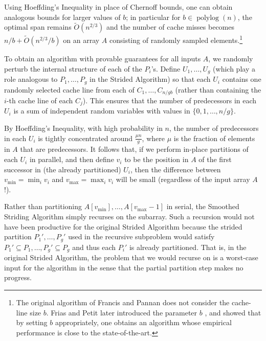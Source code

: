 \documentclass[sigconf, 10pt, nonacm]{acmart}
\renewcommand{\paragraph}[1]{\vspace{0.09in}\noindent{\bf \boldmath #1.}}
\theoremstyle{remark}
\theoremstyle{remark}
\begin{document}
Using Hoeffding's Inequality in place of Chernoff bounds, one can
obtain analogous bounds for larger values of $b$; in particular for $b
\in \operatorname{polylog}(n)$, the optimal span remains
$\tilde{O}(n^{2/3})$ and the number of cache misses becomes $n / b +
\tilde{O}(n^{2/3} / b)$ on an array $A$ consisting of randomly sampled
elements.\footnote{The original algorithm of Francis and Pannan
  \cite{FrancisPa92} does not consider the cache-line size $b$. Frias
  and Petit later introduced the parameter $b$ \cite{Frias08}, and
  showed that by setting $b$ appropriately, one obtains an algorithm
  whose empirical performance is close to the state-of-the-art.}



\paragraph{The Smoothed Striding Algorithm}
To obtain an algorithm with provable guarantees for all inputs $A$, we
randomly perturb the internal structure of each of the $P_i$'s. Define
$U_1, \ldots, U_{g}$ (which play a role analogous to $P_1,
\ldots, P_g$ in the Strided Algorithm) so that each $U_i$ contains one
randomly selected cache line from each of $C_1, \ldots, C_{n /
  gb}$ (rather than containing the $i$-th cache line of each
$C_j$). This ensures that the number of predecessors in each $U_i$ is
a sum of independent random variables with values in $\{0, 1, \ldots,
n/g\}$.

By Hoeffding's Inequality, with high probability in $n$, the number of
predecessors in each $U_i$ is tightly concentrated around $\frac{\mu
  n}{g}$, where $\mu$ is the fraction of elements in $A$ that are
predecessors. It follows that, if we perform in-place partitions of
each $U_i$ in parallel, and then define $v_i$ to be the position in
$A$ of the first successor in (the already partitioned) $U_i$, then
the difference between $v_{\text{min}} = \min_i v_i$ and
$v_{\text{max}} = \max_i v_i$ will be small (regardless of the input array
$A$!).

Rather than partitioning $A[v_{\text{min}}],\ldots,
A[v_{\text{max}}-1]$ in serial, the Smoothed Striding Algorithm simply
recurses on the subarray. Such a recursion would not have been
productive for the original Strided Algorithm because the strided
partition $P_1', \ldots, P_g'$ used in the recursive subproblem would
satisfy $P_1' \subseteq P_1, \ldots, P_g' \subseteq P_g$ and thus each
$P_i'$ is already partitioned. That is, in the original Strided
Algorithm, the problem that we would recurse on is a worst-case input
for the algorithm in the sense that the partial partition step makes
no progress.
\end{document}
